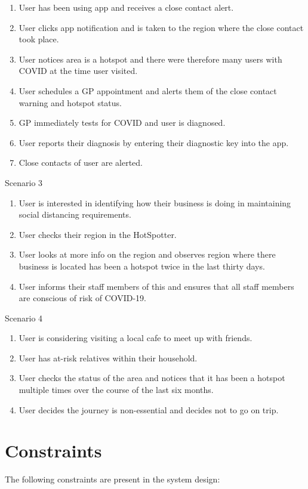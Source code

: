 \documentclass{scrreprt}
\begin{document}
\begin{enumerate}
	\item User has been using app and receives a close contact alert.
	\item User clicks app notification and is taken to the region where the close contact took place.
	\item User notices area is a hotspot and there were therefore many users with COVID at the time user visited.
	\item User schedules a GP appointment and alerts them of the close contact warning and hotspot status.
	\item GP immediately tests for COVID and user is diagnosed.
	\item User reports their diagnosis by entering their diagnostic key into the app.
	\item Close contacts of user are alerted.
\end{enumerate}
Scenario 3 
\begin{enumerate}
	\item User is interested in identifying how their business is doing in maintaining social distancing requirements.
	\item User checks their region in the HotSpotter.
	\item User looks at more info on the region and observes region where there business is located has been a hotspot twice in the last thirty days.
	\item User informs their staff members of this and ensures that all staff members are conscious of risk of COVID-19.
\end{enumerate}
Scenario 4
\begin{enumerate}
	\item User is considering visiting a local cafe to meet up with friends.
	\item User has at-risk relatives within their household.
	\item User checks the status of the area and notices that it has been a hotspot multiple times over the course of the last six months.
	\item User decides the journey is non-essential and decides not to go on trip.
\end{enumerate}

\section{Constraints}
The following constraints are present in the system design:
\end{document}
